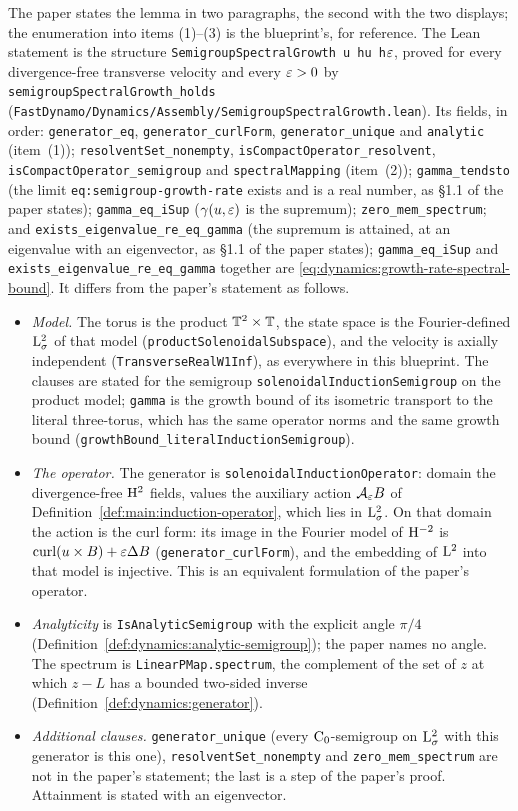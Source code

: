 The paper states the lemma in two paragraphs, the second with the two displays; the
enumeration into items (1)--(3) is the blueprint's, for reference.  The Lean statement is the
structure \texttt{SemigroupSpectralGrowth u hu h$\varepsilon$}, proved for every divergence-free
transverse velocity and every $\varepsilon>0$ by \texttt{semigroupSpectralGrowth\_holds}
(\texttt{FastDynamo/Dynamics/Assembly/SemigroupSpectralGrowth.lean}).  Its fields, in order:
\texttt{generator\_eq}, \texttt{generator\_curlForm}, \texttt{generator\_unique} and
\texttt{analytic} (item~(1)); \texttt{resolventSet\_nonempty},
\texttt{isCompactOperator\_resolvent}, \texttt{isCompactOperator\_semigroup} and
\texttt{spectralMapping} (item~(2)); \texttt{gamma\_tendsto} (the limit
\texttt{eq:semigroup-growth-rate} exists and is a real number, as §1.1 of the paper states);
\texttt{gamma\_eq\_iSup} ($\gamma(u,\varepsilon)$ is the supremum);
\texttt{zero\_mem\_spectrum}; and \texttt{exists\_eigenvalue\_re\_eq\_gamma} (the supremum is
attained, at an eigenvalue with an eigenvector, as §1.1 of the paper states);
\texttt{gamma\_eq\_iSup} and \texttt{exists\_eigenvalue\_re\_eq\_gamma} together are
\eqref{eq:dynamics:growth-rate-spectral-bound}.  It differs from the paper's
statement as follows.
\begin{itemize}
  \item \emph{Model.}  The torus is the product $\mathbb{T}^2\times\mathbb{T}$, the state space is the
    Fourier-defined $\mathrm{L}^2_\sigma$ of that model (\texttt{productSolenoidalSubspace}), and the
    velocity is axially independent (\texttt{TransverseRealW1Inf}), as everywhere in this
    blueprint.  The clauses are stated for the semigroup \texttt{solenoidalInductionSemigroup}
    on the product model; \texttt{gamma} is the growth bound of its isometric transport to the
    literal three-torus, which has the same operator norms and the same growth bound
    (\texttt{growthBound\_literalInductionSemigroup}).
  \item \emph{The operator.}  The generator is \texttt{solenoidalInductionOperator}: domain
    the divergence-free $\mathrm{H}^2$ fields, values the auxiliary action $\mathcal A_\varepsilon B$ of
    Definition~\ref{def:main:induction-operator}, which lies in $\mathrm{L}^2_\sigma$.  On that
    domain the action is the curl form: its image in the Fourier model of $\mathrm{H}^{-2}$ is
    $\operatorname{curl}(u\times B)+\varepsilon\Delta B$ (\texttt{generator\_curlForm}), and the embedding of
    $\mathrm{L}^2$ into that model is injective.  This is an equivalent formulation of the paper's
    operator.
  \item \emph{Analyticity} is \texttt{IsAnalyticSemigroup} with the explicit angle $\pi/4$
    (Definition~\ref{def:dynamics:analytic-semigroup}); the paper names no angle.  The
    spectrum is \texttt{LinearPMap.spectrum}, the complement of the set of $z$ at which
    $z-L$ has a bounded two-sided inverse (Definition~\ref{def:dynamics:generator}).
  \item \emph{Additional clauses.}  \texttt{generator\_unique} (every $\mathrm{C}_0$-semigroup on
    $\mathrm{L}^2_\sigma$ with this generator is this one), \texttt{resolventSet\_nonempty} and
    \texttt{zero\_mem\_spectrum} are not in the paper's statement; the last is a step of the
    paper's proof.  Attainment is stated with an eigenvector.
\end{itemize}
